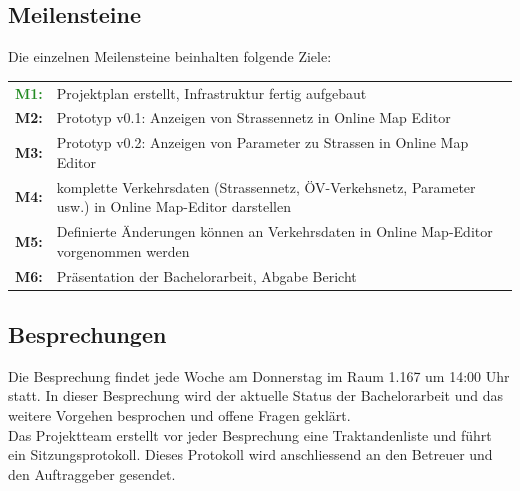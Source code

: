 \documentclass[10pt,a4paper]{article}
\begin{document}
\subsection{Meilensteine}
\begin{flushleft}
Die einzelnen Meilensteine beinhalten folgende Ziele:
\end{flushleft}
\begin{tabular}{cl}
	\textcolor{ForestGreen}{\textbf{M1:}} & Projektplan erstellt, Infrastruktur fertig aufgebaut \\[0.2cm]
	\textcolor{NavyBlue}{\textbf{M2:}} & Prototyp v0.1: Anzeigen von Strassennetz in Online Map Editor \\[0.2cm]
	\textcolor{NavyBlue}{\textbf{M3:}} & Prototyp v0.2: Anzeigen von Parameter zu Strassen in Online Map Editor \\[0.2cm]
	\textcolor{NavyBlue}{\textbf{M4:}} & komplette Verkehrsdaten (Strassennetz, ÖV-Verkehsnetz, Parameter usw.) in Online Map-Editor darstellen\\[0.2cm]
	\textcolor{NavyBlue}{\textbf{M5:}} & Definierte Änderungen können an Verkehrsdaten in Online Map-Editor vorgenommen werden\\[0.2cm]
	\textcolor{Dandelion}{\textbf{M6:}} & Präsentation der Bachelorarbeit, Abgabe Bericht\\
\end{tabular}
\subsection{Besprechungen}
\begin{flushleft}
	Die Besprechung findet jede Woche am Donnerstag im Raum 1.167 um 14:00 Uhr statt. In dieser Besprechung wird der aktuelle Status der Bachelorarbeit und das weitere Vorgehen besprochen und offene Fragen geklärt.\\
Das Projektteam erstellt vor jeder Besprechung eine Traktandenliste und führt ein Sitzungsprotokoll. Dieses Protokoll wird anschliessend an den Betreuer und den Auftraggeber gesendet.
\end{flushleft}
\end{document}
